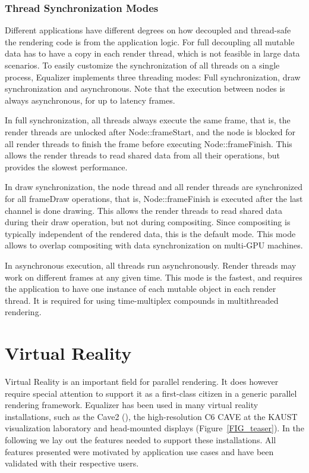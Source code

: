 \documentclass[10pt,journal,compsoc]{IEEEtran}
\newcommand{\fig}[1]{Figure~\ref{#1}}
\begin{document}
\subsubsection{Thread Synchronization Modes}\label{sec:threading}

Different applications have different degrees on how decoupled and thread-safe
the rendering code is from the application logic. For full decoupling all
mutable data has to have a copy in each render thread, which is not feasible in
large data scenarios. To easily customize the synchronization of all threads on
a single process, Equalizer implements three threading modes:  Full
synchronization, draw synchronization and asynchronous. Note that the execution
between nodes is always asynchronous, for up to \textsf{latency} frames.

In full synchronization, all threads always execute the same frame, that is, the
render threads are unlocked after \textsf{Node::frameStart}, and the node is
blocked for all render threads to finish the frame before executing
\textsf{Node::frameFinish}. This allows the render threads to read shared data
from all their operations, but provides the slowest performance.

In draw synchronization, the node thread and all render threads are synchronized
for all \textsf{frameDraw} operations, that is, \textsf{Node::frameFinish} is
executed after the last channel is done drawing. This allows the render threads
to read shared data during their draw operation, but not during
compositing. Since compositing is typically independent of the rendered data,
this is the default mode. This mode allows to overlap compositing with data
synchronization on multi-GPU machines.

In asynchronous execution, all threads run asynchronously. Render threads may
work on different frames at any given time. This mode is the fastest, and
requires the application to have one instance of each mutable object in each
render thread. It is required for using time-multiplex compounds in
multithreaded rendering.

\section{Virtual Reality}

Virtual Reality is an important field for parallel rendering. It does however
require special attention to support it as a first-class citizen in a generic
parallel rendering framework. Equalizer has been used in many virtual reality
installations, such as the Cave2 (\cite{FNTTL:13}), the high-resolution C6 CAVE
at the KAUST visualization laboratory and head-mounted displays
(\fig{FIG_teaser}). In the following we lay out the features needed to support
these installations. All features presented were motivated by application use
cases and have been validated with their respective users.
\end{document}
